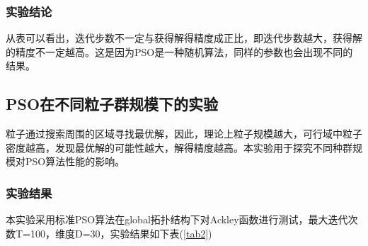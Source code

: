 \subsubsection{实验结论}
从表可以看出，迭代步数不一定与获得解得精度成正比，即迭代步数越大，获得解的精度不一定越高。这是因为PSO是一种随机算法，同样的参数也会出现不同的结果。
\subsection{PSO在不同粒子群规模下的实验}
粒子通过搜索周围的区域寻找最优解，因此，理论上粒子规模越大，可行域中粒子密度越高，发现最优解的可能性越大，解得精度越高。本实验用于探究不同种群规模对PSO算法性能的影响。
\subsubsection{实验结果}
本实验采用标准PSO算法在global拓扑结构下对Ackley函数进行测试，最大迭代次数T=100，维度D=30，实验结果如下表(\ref{tab2})
\renewcommand\arraystretch{0.9}

